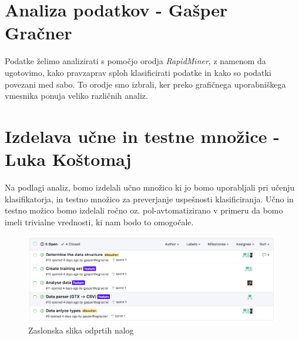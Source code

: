 \documentclass[a4paper,11pt]{article}
\begin{document}
\section{Analiza podatkov - Gašper Gračner}
Podatke želimo analizirati s pomočjo orodja \textit{RapidMiner}, z namenom da ugotovimo, kako pravzaprav sploh klasificirati podatke in kako so podatki povezani med sabo. To orodje smo izbrali, ker preko grafičnega uporabniškega vmesnika ponuja veliko različnih analiz.

\section{Izdelava učne in testne množice - Luka Koštomaj}
Na podlagi analiz, bomo izdelali učno množico ki jo bomo uporabljali pri učenju klasifikatorja, in testno množico za preverjanje uspešnosti klasificiranja. Učno in testno možico bomo izdelali ročno oz. pol-avtomatizirano v primeru da bomo imeli trivialne vrednosti, ki nam bodo to omogočale.\\

\begin{figure}[h]
\caption{Zaslonska slika odprtih nalog}
\centering
\includegraphics[width=1\textwidth]{issues}
\end{figure}
\end{document}
